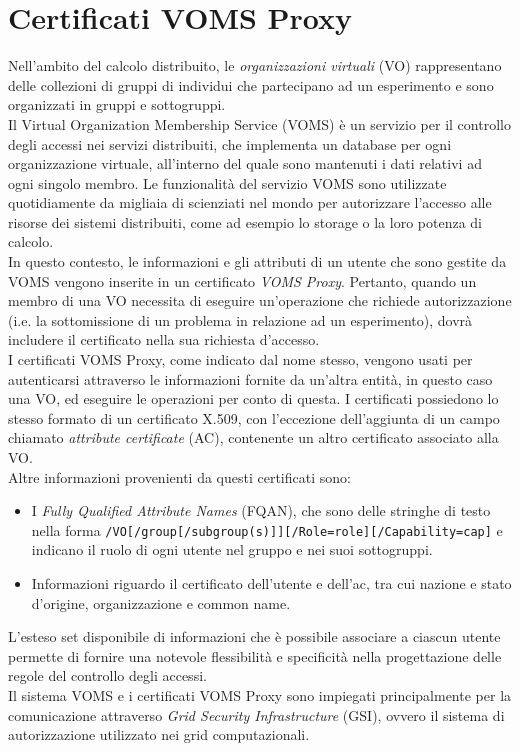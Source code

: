 \section{Certificati VOMS Proxy}
Nell'ambito del calcolo distribuito, le \textit{organizzazioni virtuali} (VO) rappresentano delle collezioni di gruppi 
di individui che partecipano ad un esperimento e sono organizzati in gruppi e sottogruppi. 
\\Il Virtual Organization Membership Service (VOMS) \cite{voms_res_1} è un servizio per il controllo degli accessi 
nei servizi distribuiti, che implementa
un database per ogni organizzazione virtuale, all'interno del
quale sono mantenuti i dati relativi ad ogni singolo membro. Le funzionalità del servizio VOMS sono utilizzate quotidiamente da 
migliaia di scienziati nel mondo per autorizzare l'accesso alle risorse dei sistemi distribuiti, come ad esempio lo storage o la
loro potenza di calcolo. 
\\ In questo contesto, le informazioni e gli attributi di un utente che sono gestite da VOMS vengono inserite in un certificato \textit{VOMS Proxy}.
Pertanto, quando un membro di una VO necessita di eseguire un'operazione che richiede autorizzazione (i.e. la sottomissione di un problema in relazione ad un esperimento), 
dovrà includere il certificato nella sua richiesta d'accesso. 
\\ I certificati VOMS Proxy, come indicato dal nome stesso, vengono usati per autenticarsi attraverso le informazioni fornite da un'altra entità, in questo caso una VO, ed eseguire le operazioni
per conto di questa. I certificati possiedono lo stesso formato di un certificato X.509, con l'eccezione dell'aggiunta di un campo chiamato \textit{attribute certificate} (AC),
 contenente un altro certificato associato alla VO. 
\\ Altre informazioni provenienti da questi certificati sono:
\begin{itemize}
    \item I \textit{Fully Qualified Attribute Names} (FQAN), che sono delle stringhe di testo nella 
    forma \texttt{/VO[/group[/subgroup(s)]][/Role=role][/Capability=cap]} e indicano il ruolo di ogni utente nel gruppo e nei suoi sottogruppi. 
    \item Informazioni riguardo il certificato dell'utente e dell'ac, tra cui nazione e stato d'origine, organizzazione e common name.   
\end{itemize}
L'esteso set disponibile di informazioni che è possibile associare a ciascun utente permette di fornire
 una notevole flessibilità e specificità nella progettazione delle regole del controllo degli accessi. 
 \\ Il sistema VOMS e i certificati VOMS Proxy sono impiegati principalmente per la comunicazione attraverso \textit{Grid Security Infrastructure} (GSI), ovvero 
il sistema di autorizzazione utilizzato nei grid computazionali. 

